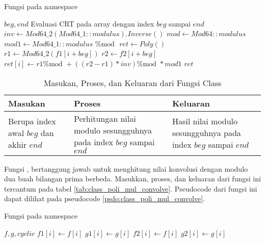 \begin{algorithm}
	\caption{Fungsi  pada namespace }
	\label{psdo:class_poli_mul_crt}
	\begin{algorithmic}[1]
		\Require $ beg, end $
		\Ensure Evaluasi CRT pada array dengan index $ beg $ sampai $ end $
		\State $ inv \leftarrow Mod64\_2(Mod64\_1::modulus).Inverse() $
		\State $ mod \leftarrow Mod64::modulus $
		\State $ mod1 \leftarrow Mod64\_1::modulus \text{ \% mod }$
		\State $ ret \leftarrow Poly() $
			\State $ r1 \leftarrow Mod64\_2(f1[i + beg])$
			\State $ r2 \leftarrow f2[i + beg] $
			\State $ ret[i] \leftarrow r1 \text{\% mod } + ((r2 - r1) * inv)  \text{\% mod } * mod1$
		\EndFor
		\State \Return $ ret $
	\end{algorithmic}
\end{algorithm}

\begin{table}[]	
	\Centering
	\begin{tabular}{|p{3cm}|p{3cm}|p{3cm}|}
	\hline
	Masukan & Proses & Keluaran \\ \hline
	Berupa index awal $beg$ dan akhir $end$ & Perhitungan nilai modulo sesungguhnya pada index $ beg $ sampai $end$ & Hasil nilai modulo sesungguhnya pada index $ beg $ sampai $end$ \\ \hline
	\end{tabular}
	\caption{Masukan, Proses, dan Keluaran dari Fungsi  Class }
	\label{tab:class_poli_mul_crt}
\end{table}

\newpage

Fungsi , bertanggung jawab untuk menghitung nilai konvolusi dengan modulo dua buah bilangan prima berbeda. Masukkan, proses, dan keluaran dari fungsi ini tercantum pada tabel \ref{tab:class_poli_mul_convolve}. Pseudocode dari fungsi ini dapat dilihat pada pseudocode \ref{psdo:class_poli_mul_convolve}.

\begin{algorithm}
	\caption{Fungsi  pada namespace }
	\label{psdo:class_poli_mul_convolve}
	\begin{algorithmic}[1]
		\Require $ f, g, cyclic $
			\State $f1[i] \leftarrow f[i] $
		\EndFor
			\State $g1[i] \leftarrow g[i] $
		\EndFor
		\State {}
			\State $f2[i] \leftarrow f[i] $
		\EndFor
			\State $g2[i] \leftarrow g[i] $
		\EndFor
		\State {}
	\end{algorithmic}
\end{algorithm}

